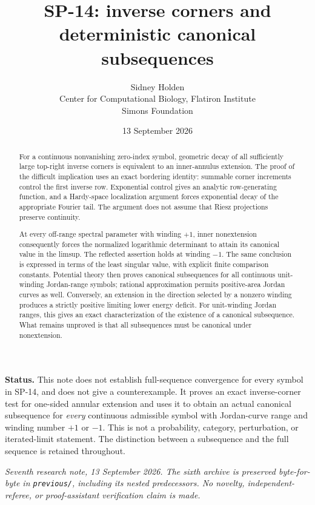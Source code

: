 \documentclass[11pt]{article}
\title{SP-14: inverse corners and deterministic canonical subsequences}
\author{Sidney Holden\\{\small Center for Computational Biology, Flatiron Institute}\\{\small Simons Foundation}}
\date{13 September 2026}
\theoremstyle{definition}
\begin{document}
\maketitle
\vspace{-2.4em}
\textbf{Status.} This note does not establish full-sequence convergence for every symbol in SP-14, and does not give a counterexample. It proves an exact inverse-corner test for one-sided annular extension and uses it to obtain an actual canonical subsequence for \emph{every} continuous admissible symbol with Jordan-curve range and winding number $+1$ or $-1$. This is not a probability, category, perturbation, or iterated-limit statement. The distinction between a subsequence and the full sequence is retained throughout.

\begin{abstract}
For a continuous nonvanishing zero-index symbol, geometric decay of all sufficiently large top-right inverse corners is equivalent to an inner-annulus extension. The proof of the difficult implication uses an exact bordering identity: summable corner increments control the first inverse row. Exponential control gives an analytic row-generating function, and a Hardy-space localization argument forces exponential decay of the appropriate Fourier tail. The argument does not assume that Riesz projections preserve continuity.

At every off-range spectral parameter with winding $+1$, inner nonextension consequently forces the normalized logarithmic determinant to attain its canonical value in the limsup. The reflected assertion holds at winding $-1$. The same conclusion is expressed in terms of the least singular value, with explicit finite comparison constants. Potential theory then proves canonical subsequences for all continuous unit-winding Jordan-range symbols; rational approximation permits positive-area Jordan curves as well. Conversely, an extension in the direction selected by a nonzero winding produces a strictly positive limiting lower energy deficit. For unit-winding Jordan ranges, this gives an exact characterization of the existence of a canonical subsequence. What remains unproved is that all subsequences must be canonical under nonextension.
\end{abstract}

\textit{Seventh research note, 13 September 2026. The sixth archive is preserved byte-for-byte in \texttt{previous/}, including its nested predecessors. No novelty, independent-referee, or proof-assistant verification claim is made.}
\newpage
\tableofcontents
\newpage
\end{document}
